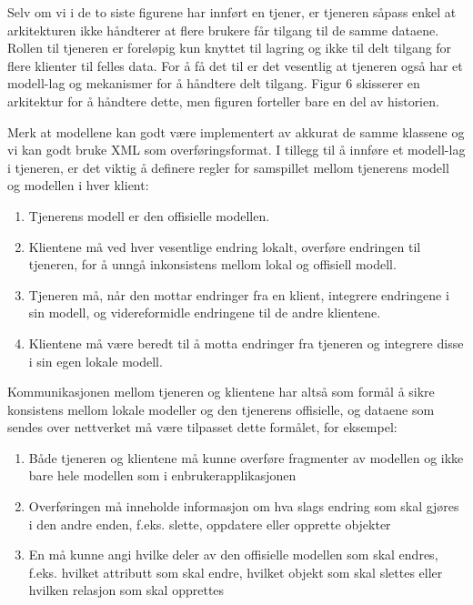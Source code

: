 Selv om vi i de to siste figurene har innført en tjener, er tjeneren såpass enkel at arkitekturen ikke håndterer at flere brukere får tilgang til de samme dataene. Rollen til tjeneren er foreløpig kun knyttet til lagring og ikke til delt tilgang for flere klienter til felles data. For å få det til er det vesentlig at tjeneren også har et modell-lag og mekanismer for å håndtere delt tilgang. Figur 6 skisserer en arkitektur for å håndtere dette, men figuren forteller bare en del av historien.

Merk at modellene kan godt være implementert av akkurat de samme klassene og vi kan godt bruke XML som overføringsformat. I tillegg til å innføre et modell-lag i tjeneren, er det viktig å definere regler for samspillet mellom tjenerens modell og modellen i hver klient:

\begin{enumerate}

\item
Tjenerens modell er den offisielle modellen.

\item
Klientene må ved hver vesentlige endring lokalt, overføre endringen til tjeneren, for å unngå inkonsistens mellom lokal og offisiell modell.

\item
Tjeneren må, når den mottar endringer fra en klient, integrere endringene i sin modell, og videreformidle endringene til de andre klientene.

\item
Klientene må være beredt til å motta endringer fra tjeneren og integrere disse i sin egen lokale modell.

\end{enumerate}

Kommunikasjonen mellom tjeneren og klientene har altså som formål å sikre konsistens mellom lokale modeller og den tjenerens offisielle, og dataene som sendes over nettverket må være tilpasset dette formålet, for eksempel:

\begin{enumerate}

\item
Både tjeneren og klientene må kunne overføre fragmenter av modellen og ikke bare hele modellen som i enbrukerapplikasjonen

\item
Overføringen må inneholde informasjon om hva slags endring som skal gjøres i den andre enden, f.eks. slette, oppdatere eller opprette objekter

\item
En må kunne angi hvilke deler av den offisielle modellen som skal endres, f.eks. hvilket attributt som skal endre, hvilket objekt som skal slettes eller hvilken relasjon som skal opprettes

\end{enumerate}

